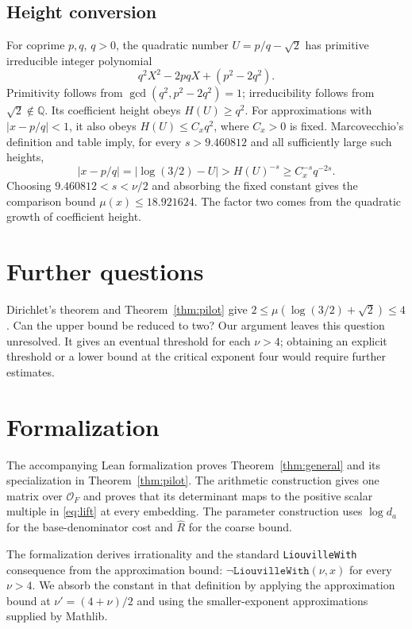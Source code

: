 \documentclass[11pt]{article}
\newcommand{\Q}{\mathbb Q}
\newcommand{\OO}{\mathcal O}
\theoremstyle{remark}
\begin{document}
\subsection{Height conversion}\label{sec:benchmark}
For coprime $p,q$, $q>0$, the quadratic number
$U=p/q-\sqrt2$ has primitive irreducible integer polynomial
\[
q^2X^2-2pqX+(p^2-2q^2).
\]
Primitivity follows from $\gcd(q^2,p^2-2q^2)=1$; irreducibility
follows from $\sqrt2\notin\Q$. Its coefficient height obeys
$H(U)\ge q^2$. For approximations with $|x-p/q|<1$, it also obeys
$H(U)\le C_xq^2$, where $C_x>0$ is fixed.
Marcovecchio's definition and table
\cite[pp.~147, 151, 182]{marcovecchio} imply, for every
$s>9.460812$ and all sufficiently large such heights,
\[
|x-p/q|=|\log(3/2)-U|>H(U)^{-s}
\ge C_x^{-s}q^{-2s}.
\]
Choosing $9.460812<s<\nu/2$ and absorbing the fixed constant gives
the comparison bound $\mu(x)\le18.921624$.
The factor two comes from the quadratic growth of coefficient height.

\section{Further questions}
Dirichlet's theorem and Theorem~\ref{thm:pilot} give
$2\le\mu(\log(3/2)+\sqrt2)\le4$. Can the upper bound be reduced
to two? Our argument leaves this question unresolved. It gives an
eventual threshold for each $\nu>4$; obtaining an explicit threshold
or a lower bound at the critical exponent four would require further
estimates.

\appendix
\section{Formalization}\label{sec:formalization}
The accompanying Lean formalization proves Theorem~\ref{thm:general}
and its specialization in Theorem~\ref{thm:pilot}. The arithmetic
construction gives one matrix over $\OO_F$ and proves that its
determinant maps to the positive scalar multiple in \eqref{eq:lift}
at every embedding. The parameter construction uses $\log d_a$ for
the base-denominator cost and $\widehat R$ for the coarse bound.

The formalization derives irrationality and the standard
\texttt{LiouvilleWith} consequence from the approximation bound:
$\neg\texttt{LiouvilleWith}(\nu,x)$ for every $\nu>4$.
We absorb the constant in that definition by applying the approximation
bound at $\nu'=(4+\nu)/2$ and using the smaller-exponent approximations
supplied by Mathlib.
\end{document}
